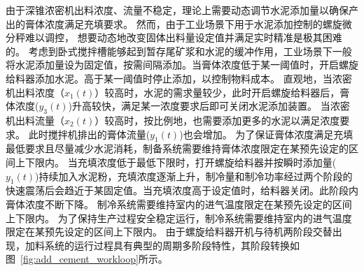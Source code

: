 由于深锥浓密机出料浓度、流量不稳定，理论上需要动态调节水泥添加量以确保产出的膏体浓度满足充填要求。
然而，由于工业场景下用于水泥添加控制的螺旋微分秤难以调控，
想要动态地改变固体出料量设定值并满足实时精准是极其困难的。
考虑到卧式搅拌槽能够起到暂存尾矿浆和水泥的缓冲作用，工业场景下一般将水泥添加量设为固定值，按需间隔添加。当膏体浓度低于某一阈值时，开启螺旋给料器添加水泥。高于某一阈值时停止添加，以控制物料成本。
直观地，当浓密机出料浓度（$x_1(t)$）较高时，水泥的需求量较少，此时开启螺旋给料器后，膏体浓度($y_3(t)$)升高较快，满足某一浓度要求后即可关闭水泥添加装置。
当浓密机出料流量（$x_2(t)$）较高时，按比例地，也需要添加更多的水泥以满足浓度要求。
此时搅拌机排出的膏体流量($y_1(t)$)也会增加。
为了保证膏体浓度满足充填最低要求且尽量减少水泥消耗，制备系统需要维持膏体浓度限定在某预先设定的区间上下限内。
当充填浓度低于最低下限时，打开螺旋给料器并按瞬时添加量($y_1(t)$)持续加入水泥粉，充填浓度逐渐上升，制冷量和制冷功率经过两个阶段的快速震荡后会趋近于某固定值。当充填浓度高于设定值时，给料器关闭。此阶段内膏体浓度不断下降。
制冷系统需要维持室内的进气温度限定在某预先设定的区间上下限内。
为了保持生产过程安全稳定运行，制冷系统需要维持室内的进气温度限定在某预先设定的区间上下限内。
由于螺旋给料器开机与待机两阶段交替出现，加料系统的运行过程具有典型的周期多阶段特性，其阶段转换如图~\ref{fig:add_cement_workloop}所示。 

